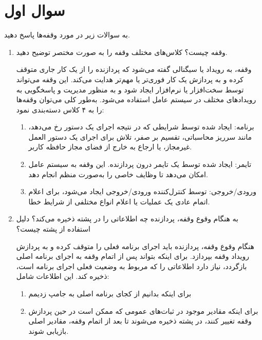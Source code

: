 \section{سوال اول}

به سوالات زیر در مورد وقفه‌ها پاسخ دهید.

\begin{enumerate}
	\item 
	وقفه چیست؟ کلاس‌های مختلف وقفه را به صورت مختصر توضیح دهید.
	\begin{qsolve}
		وقفه، به رویداد یا سیگنالی گفته می‌شود که پردازنده را از یک کار جاری متوقف کرده و به پردازش یک کار فوری‌تر یا مهم‌تر هدایت می‌کند. این وقفه می‌تواند توسط سخت‌افزار یا نرم‌افزار ایجاد شود و به منظور مدیریت و پاسخگویی به رویدادهای مختلف در سیستم عامل استفاده می‌شود. به‌طور کلی می‌توان وقفه‌ها را به ۴ کلاس دسته‌بندی نمود:
		
		\begin{enumerate}
			\item 
			برنامه: ایجاد شده توسط شرایطی که در نتیجه اجرای یک دستور رخ می‌دهد، مانند سرریز محاسباتی، تقسیم بر صفر، تلاش برای اجرای یک دستور العمل غیرمجاز، یا ارجاع به خارج از فضای مجاز حافظه کاربر.
			 
			 \item 
			 تایمر: ایجاد شده توسط یک تایمر درون پردازنده. این وقفه به سیستم عامل امکان می‌دهد تا وظایف خاصی را به‌صورت منظم انجام دهد.
			 
			 \item 
			 ورودی/خروجی: توسط کنترل‌کننده ورودی/خروجی ایجاد می‌شود، برای اعلام اتمام عادی یک عملیات یا اعلام انواع مختلفی از شرایط خطا.
			 
		\end{enumerate}
		
	\end{qsolve}
	
	
	\item 
	به هنگام وقوع وقفه، پردازنده چه اطلاعاتی را در پشته ذخیره می‌کند؟ دلیل استفاده از پشته چیست؟ 
	\begin{qsolve}
		هنگام وقوع وقفه، پردازنده باید اجرای برنامه فعلی را متوقف کرده و به پردازش رویداد وقفه بپردازد. برای اینکه بتواند پس از اتمام وقفه به اجرای برنامه اصلی بازگردد، نیاز دارد اطلاعاتی را که مربوط به وضعیت فعلی اجرای برنامه است، ذخیره کند. این اطلاعات شامل:
		\begin{enumerate}
			\item 
			برای اینکه بدانیم از کجای برنامه اصلی به   جامپ زدیمم
			
			\item 
			برای اینکه مقادیر موجود در ثبات‌های عمومی که ممکن است در حین پردازش وقفه تغییر کنند، در پشته ذخیره می‌شوند تا بعد از اتمام وقفه، مقادیر اصلی بازیابی شوند.
			

\end{enumerate}
\end{qsolve}
\end{enumerate}
